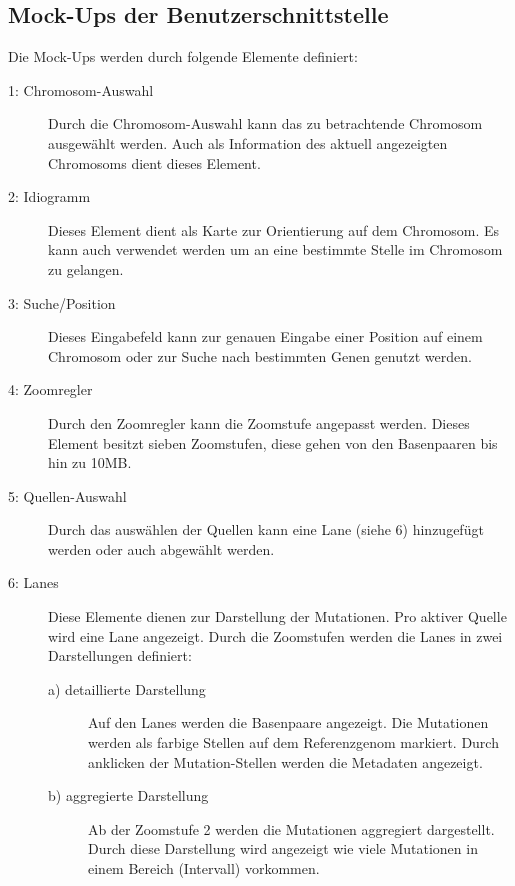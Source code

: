 \subsection{Mock-Ups der Benutzerschnittstelle}
Die Mock-Ups werden durch folgende Elemente definiert:
\begin{description}
	\item[1: Chromosom-Auswahl] Durch die Chromosom-Auswahl kann das zu betrachtende Chromosom ausgewählt werden. Auch als Information des aktuell angezeigten Chromosoms dient dieses Element.
	\item[2: Idiogramm] Dieses Element dient als Karte zur Orientierung auf dem Chromosom. Es kann auch verwendet werden um an eine bestimmte Stelle im Chromosom zu gelangen.
	\item[3: Suche/Position] Dieses Eingabefeld kann zur genauen Eingabe einer Position auf einem Chromosom oder zur Suche nach bestimmten Genen genutzt werden.
	\item[4: Zoomregler] Durch den Zoomregler kann die Zoomstufe angepasst werden. Dieses Element besitzt sieben Zoomstufen, diese gehen von den Basenpaaren bis hin zu 10MB. 
	\item[5: Quellen-Auswahl] Durch das auswählen der Quellen kann eine Lane (siehe 6) hinzugefügt werden oder auch abgewählt werden.
	\item[6: Lanes] Diese Elemente dienen zur Darstellung der Mutationen. Pro aktiver Quelle wird eine Lane angezeigt. Durch die Zoomstufen werden die Lanes in zwei Darstellungen definiert:
	\begin{description}
		\item[a) detaillierte Darstellung] Auf den Lanes werden die Basenpaare angezeigt. Die Mutationen werden als farbige Stellen auf dem Referenzgenom markiert. Durch anklicken der Mutation-Stellen werden die Metadaten angezeigt.
		\item[b) aggregierte Darstellung] Ab der Zoomstufe 2 werden die Mutationen aggregiert dargestellt. Durch diese Darstellung wird angezeigt wie viele Mutationen in einem Bereich (Intervall) vorkommen.
	\end{description}
\end{description}


